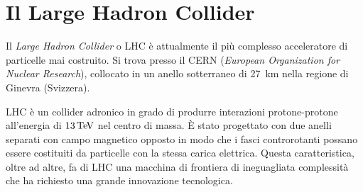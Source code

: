 %
%
%

\section{Il Large Hadron Collider}
Il {\em Large Hadron Collider} o LHC \cite{Evans:2008zzb} è attualmente il più complesso acceleratore di particelle mai costruito. Si trova presso il  CERN ({\em European Organization for Nuclear Research}), collocato in un anello sotterraneo di 27~km nella regione di Ginevra (Svizzera). 

LHC \`e un collider adronico in grado di produrre interazioni protone-protone all'energia di $13{\rm \, Te\kern-0.125em V}$ nel centro di massa. \`E stato progettato con due anelli separati con campo magnetico opposto in modo che i fasci controrotanti possano essere costituiti da particelle con la stessa carica elettrica. Questa caratteristica, oltre ad altre, fa di LHC una macchina di frontiera di ineguagliata complessit\`a che ha richiesto una grande innovazione tecnologica. 

